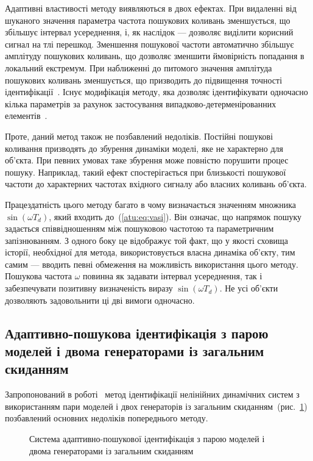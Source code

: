 Адаптивні властивості методу виявляються в двох ефектах. При
видаленні від шуканого значення параметра частота пошукових
коливань зменшується, що збільшує інтервал усереднення,
і, як наслідок --- дозволяє виділити корисний сигнал на тлі
перешкод. Зменшення пошукової частоти автоматично збільшує
амплітуду пошукових коливань, що дозволяє зменшити ймовірність
попадання в локальний екстремум. При наближенні до питомого
значення амплітуда пошукових коливань зменшується, що
призводить до підвищення точності
ідентифікації~\cite{mai_sear_meth_akt_id_ns,mai_syntez_adop_id,bodyan_adapt_viyavl}.
Існує модифікація методу, яка дозволяє ідентифікувати
одночасно кілька параметрів за рахунок застосування
випадково-детерменірованних елементів~\cite{mich_92, mich_upr_prost_mech}.

Проте, даний метод також не позбавлений недоліків. Постійні
пошукові коливання призводять до збурення динаміки моделі,
яке не характерно для об'єкта. При певних умовах таке збурення
може повністю порушити процес пошуку. Наприклад, такий
ефект спостерігається при близькості пошукової частоти до
характерних частотах вхідного сигналу або власних коливань
об'єкта.

Працездатність цього методу багато в чому визначається
значенням множника
$ \sin(\omega T_d)$, який входить до~(\ref{atu:eq:vasi}).
Він означає, що напрямок пошуку задається
співвідношенням між пошуковою частотою та параметричним запізнюванням.
З одного боку це відображує той факт, що у якості сховища історії,
необхідної для метода, використовується власна динаміка об'єкту,
тим самим --- вводить певні
обмеження на можливість використання цього методу.
Пошукова частота $\omega$ повинна як задавати інтервал усереднення,
так і забезпечувати
позитивну визначеність виразу $ \sin(\omega T_d)$.
Не усі об'єкти дозволяють
задовольнити ці дві вимоги одночасно.



\subsection{Адаптивно-пошукова ідентифікація з парою моделей і двома генераторами із загальним скиданням}%

Запропонований в роботі~\cite{atu_phd_thesis} метод ідентифікації
нелінійних динамічних систем з використанням пари моделей
і двох генераторів із загальним скиданням~(рис.~\ref{atu:f:apid2})
позбавлений основних недоліків попереднього методу.

\begin{figure}[htb!]
\begin{center}

\end{center}
\caption{Система адаптивно-пошукової ідентифікація з парою моделей і двома генераторами із загальним скиданням}
\label{atu:f:apid2}
\end{figure}


